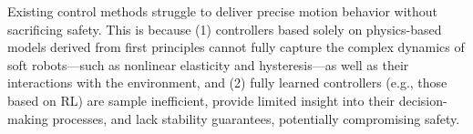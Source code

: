 Existing control methods struggle to deliver precise motion behavior without sacrificing safety. This is because (1) controllers based solely on physics-based models derived from first principles cannot fully capture the complex dynamics of soft robots—such as nonlinear elasticity and hysteresis—as well as their interactions with the environment, and (2) fully learned controllers (e.g., those based on \gls{RL}) are sample inefficient, provide limited insight into their decision-making processes, and lack stability guarantees, potentially compromising safety.

